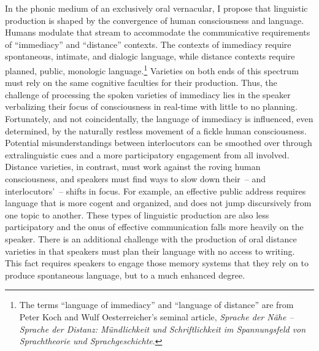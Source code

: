 In the phonic medium of an exclusively oral vernacular, I propose that linguistic production is shaped by the convergence of human consciousness and language. Humans modulate that stream to accommodate the communicative requirements of “immediacy” and “distance” contexts. The contexts of immediacy require spontaneous, intimate, and dialogic language, while distance contexts require planned, public, monologic language.\footnote{The terms “language of immediacy” and “language of distance” are from Peter Koch and Wulf Oesterreicher’s seminal \citeyear{KochOesterreicher1985} article, \textit{Sprache der Nähe – Sprache der Distanz: Mündlichkeit und Schriftlichkeit im Spannungsfeld von Sprachtheorie und Sprachgeschichte}.} Varieties on both ends of this spectrum must rely on the same cognitive faculties for their production. Thus, the challenge of processing the spoken varieties of immediacy lies in the speaker verbalizing their focus of consciousness in real-time with little to no planning. Fortunately, and not coincidentally, the language of immediacy is influenced, even determined, by the naturally restless movement of a fickle human consciousness. Potential misunderstandings between interlocutors can be smoothed over through extralinguistic cues and a more participatory engagement from all involved. Distance varieties, in contrast, must work against the roving human consciousness, and speakers must find ways to slow down their~-- and interlocutors’~-- shifts in focus. For example, an effective public address requires language that is more cogent and organized, and does not jump discursively from one topic to another. These types of linguistic production are also less participatory and the onus of effective communication falls more heavily on the speaker. There is an additional challenge with the production of oral distance varieties in that speakers must plan their language with no access to writing. This fact requires speakers to engage those memory systems that they rely on to produce spontaneous language, but to a much enhanced degree.

